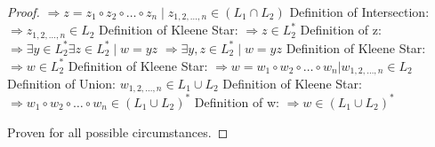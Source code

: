 \documentclass{article}
\begin{document}
\begin{proof}
  $\Longrightarrow z = z_1 \circ z_2 \circ \ldots \circ z_n \mid z_{1,2, \ldots, n} \in (L_1 \cap L_2)$ \newline
  Definition of Intersection: \newline
  $\Longrightarrow z_{1,2, \ldots, n} \in L_2$ \newline
  Definition of Kleene Star: \newline
  $\Longrightarrow z \in L_2^{*}$ \newline
  Definition of z: \newline
  $\Longrightarrow \exists y \in L_2^{*} \exists z \in L_2^{*} \mid w = yz$ \newline
  $\Longrightarrow \exists y,z \in L_2^{*} \mid w = yz$ \newline
  Definition of Kleene Star: \newline
  $\Longrightarrow w \in L_2^{*}$ \newline
  Definition of Kleene Star: \newline
  $\Longrightarrow w = w_1 \circ w_2 \circ \ldots \circ w_n | w_{1,2, \ldots, n} \in L_2$ \newline
  Definition of Union: \newline
  $w_{1,2, \ldots, n} \in L_1 \cup L_2 $ \newline
  Definition of Kleene Star: \newline
  $\Longrightarrow w_1 \circ w_2 \circ \ldots \circ w_n \in (L_1 \cup L_2)^{*} $ \newline
  Definition of w: \newline
  $\Longrightarrow w \in (L_1 \cup L_2)^{*} $ \newline

  Proven for all possible circumstances.
  



\end{proof}
\end{document}
